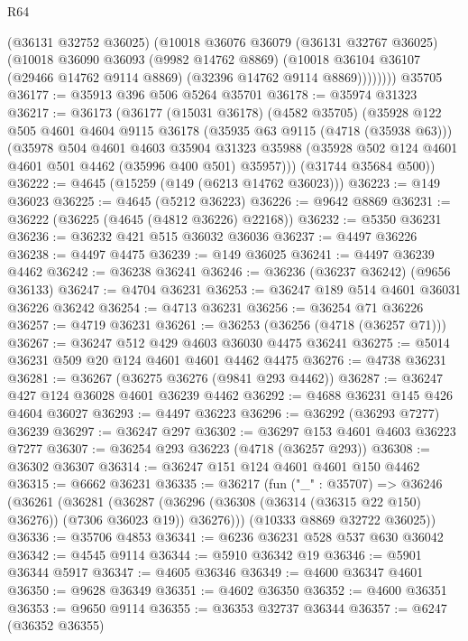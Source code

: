 \begin{lexlean}{R64}
\begin{coremodule}
            (@36131 @32752 @36025)
            (@10018
              @36076
              @36079
              (@36131 @32767 @36025)
              (@10018
                @36090
                @36093
                (@9982 @14762 @8869)
                (@10018 @36104 @36107 (@29466 @14762 @9114 @8869) (@32396 @14762 @9114 @8869))))))))
    @35705
@36177 := @35913 @396 @506 @5264 @35701
@36178 := @35974 @31323
@36217 := @36173
    (@36177
      (@15031 @36178)
      (@4582 @35705)
      (@35928
        @122
        @505
        @4601
        @4604
        @9115
        @36178
        (@35935 @63 @9115 (@4718 (@35938 @63)))
        (@35978
          @504
          @4601
          @4603
          @35904
          @31323
          @35988
          (@35928 @502 @124 @4601 @4601 @501 @4462 (@35996 @400 @501) @35957)))
      (@31744 @35684 @500))
@36222 := @4645 (@15259 (@149 (@6213 @14762 @36023)))
@36223 := @149 @36023
@36225 := @4645 (@5212 @36223)
@36226 := @9642 @8869
@36231 := @36222 (@36225 (@4645 (@4812 @36226) @22168))
@36232 := @5350 @36231
@36236 := @36232 @421 @515 @36032 @36036
@36237 := @4497 @36226
@36238 := @4497 @4475
@36239 := @149 @36025
@36241 := @4497 @36239 @4462
@36242 := @36238 @36241
@36246 := @36236 (@36237 @36242) (@9656 @36133)
@36247 := @4704 @36231
@36253 := @36247 @189 @514 @4601 @36031 @36226 @36242
@36254 := @4713 @36231
@36256 := @36254 @71 @36226
@36257 := @4719 @36231
@36261 := @36253 (@36256 (@4718 (@36257 @71)))
@36267 := @36247 @512 @429 @4603 @36030 @4475 @36241
@36275 := @5014 @36231 @509 @20 @124 @4601 @4601 @4462 @4475
@36276 := @4738 @36231
@36281 := @36267 (@36275 @36276 (@9841 @293 @4462))
@36287 := @36247 @427 @124 @36028 @4601 @36239 @4462
@36292 := @4688 @36231 @145 @426 @4604 @36027
@36293 := @4497 @36223
@36296 := @36292 (@36293 @7277) @36239
@36297 := @36247 @297
@36302 := @36297 @153 @4601 @4603 @36223 @7277
@36307 := @36254 @293 @36223 (@4718 (@36257 @293))
@36308 := @36302 @36307
@36314 := @36247 @151 @124 @4601 @4601 @150 @4462
@36315 := @6662 @36231
@36335 := @36217
    (fun ("_" : @35707) =>
    @36246
      (@36261
        (@36281
          (@36287 (@36296 (@36308 (@36314 (@36315 @22 @150) @36276)) (@7306 @36023 @19)) @36276)))
      (@10333 @8869 @32722 @36025))
@36336 := @35706 @4853
@36341 := @6236 @36231 @528 @537 @630 @36042
@36342 := @4545 @9114
@36344 := @5910 @36342 @19
@36346 := @5901 @36344 @5917
@36347 := @4605 @36346
@36349 := @4600 @36347 @4601
@36350 := @9628 @36349
@36351 := @4602 @36350
@36352 := @4600 @36351
@36353 := @9650 @9114
@36355 := @36353 @32737 @36344
@36357 := @6247 (@36352 @36355)

\end{coremodule}
\end{lexlean}
